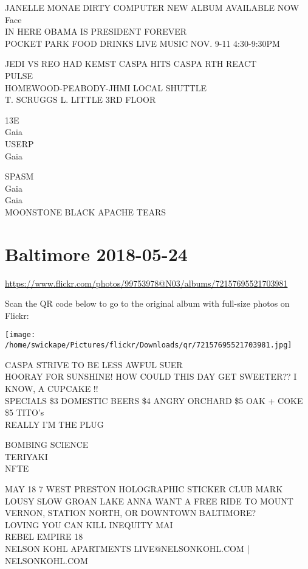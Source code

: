 \documentclass[10pt,letterpaper]{article}
\begin{document}
JANELLE MONAE DIRTY COMPUTER NEW ALBUM AVAILABLE NOW\\
Face\\
IN HERE OBAMA IS PRESIDENT FOREVER\\
POCKET PARK FOOD DRINKS LIVE MUSIC NOV. 9{-}11 4:30{-}9:30PM

JEDI VS REO HAD KEMST CASPA HITS CASPA RTH REACT\\
PULSE\\
HOMEWOOD{-}PEABODY{-}JHMI LOCAL SHUTTLE\\
T. SCRUGGS L. LITTLE 3RD FLOOR

13E\\
Gaia\\
USERP\\
Gaia

SPASM\\
Gaia\\
Gaia\\
MOONSTONE BLACK APACHE TEARS
\pagebreak

\section*{Baltimore 2018-05-24}

\url{https://www.flickr.com/photos/99753978@N03/albums/72157695521703981}

Scan the QR code below to go to the original album with full-size photos on Flickr:

\texttt{[image: /home/swickape/Pictures/flickr/Downloads/qr/72157695521703981.jpg]}
\pagebreak

CASPA STRIVE TO BE LESS AWFUL SUER\\
HOORAY FOR SUNSHINE!  HOW COULD THIS DAY GET SWEETER??  I KNOW, A CUPCAKE !!\\
SPECIALS \$3 DOMESTIC BEERS \$4 ANGRY ORCHARD \$5 OAK + COKE \$5 TITO's\\
REALLY I'M THE PLUG

BOMBING SCIENCE\\
TERIYAKI\\
NFTE

MAY 18 7 WEST PRESTON HOLOGRAPHIC STICKER CLUB MARK LOUSY SLOW GROAN LAKE ANNA WANT A FREE RIDE TO MOUNT VERNON, STATION NORTH, OR DOWNTOWN BALTIMORE?\\
LOVING YOU CAN KILL INEQUITY MAI\\
REBEL EMPIRE 18\\
NELSON KOHL APARTMENTS LIVE@NELSONKOHL.COM | NELSONKOHL.COM
\end{document}
